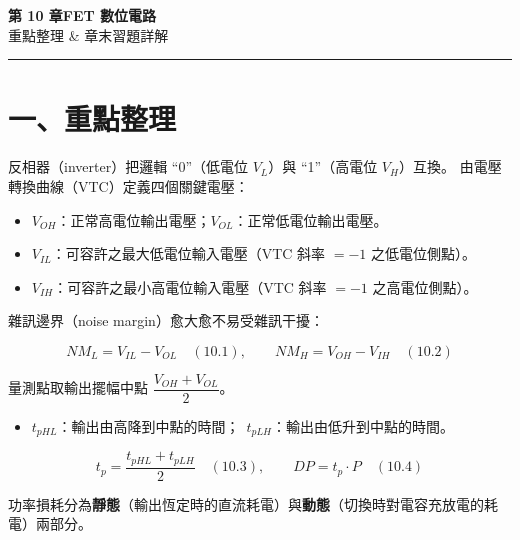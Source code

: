 \documentclass[12pt]{article}
\begin{document}
\begin{center}
{\Huge\bfseries\color{maincol} 第 10 章\quad FET 數位電路}\\[0.4em]
{\large\color{keycol} 重點整理 \;\&\; 章末習題詳解}
\end{center}
\vspace{0.5em}
\hrule
\vspace{1em}

\section*{一、重點整理}

\begin{keybox}[10.1\ \ 數位反相器與雜訊邊界]
反相器（inverter）把邏輯 ``0''（低電位 $V_L$）與 ``1''（高電位 $V_H$）互換。
由電壓轉換曲線（VTC）定義四個關鍵電壓：
\begin{itemize}[leftmargin=2.2em,itemsep=1pt]
  \item $V_{OH}$：正常高電位輸出電壓；\quad $V_{OL}$：正常低電位輸出電壓。
  \item $V_{IL}$：可容許之最大低電位輸入電壓（VTC 斜率 $=-1$ 之低電位側點）。
  \item $V_{IH}$：可容許之最小高電位輸入電壓（VTC 斜率 $=-1$ 之高電位側點）。
\end{itemize}
雜訊邊界（noise margin）愈大愈不易受雜訊干擾：
\begin{formulabox}
\[ NM_L = V_{IL}-V_{OL}\quad(10.1),\qquad NM_H = V_{OH}-V_{IH}\quad(10.2) \]
\end{formulabox}
\end{keybox}

\begin{keybox}
量測點取輸出擺幅中點 $\dfrac{V_{OH}+V_{OL}}{2}$。
\begin{itemize}[leftmargin=2.2em,itemsep=1pt]
  \item $t_{pHL}$：輸出由高降到中點的時間；\ $t_{pLH}$：輸出由低升到中點的時間。
\end{itemize}
\begin{formulabox}
\[ t_p=\frac{t_{pHL}+t_{pLH}}{2}\quad(10.3),\qquad DP=t_p\cdot P\quad(10.4) \]
\end{formulabox}
功率損耗分為\textbf{靜態}（輸出恆定時的直流耗電）與\textbf{動態}（切換時對電容充放電的耗電）兩部分。
\end{keybox}
\end{document}
